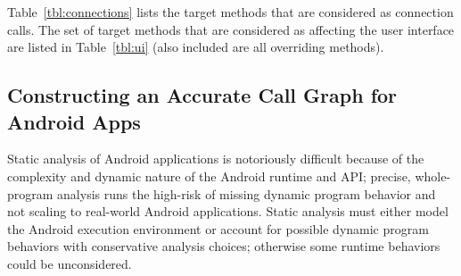 Table~\ref{tbl:connections} lists the target methods that are considered as
connection calls.  The set of target methods that are considered as
affecting the user interface are listed in Table~\ref{tbl:ui} (also
included are all overriding methods).







\subsection{Constructing an Accurate Call Graph for Android Apps }

Static analysis of Android applications is notoriously difficult
because of the complexity and dynamic nature of the Android runtime
and API; precise, whole-program analysis runs the high-risk of missing
dynamic program behavior and not scaling to real-world Android
applications.  Static analysis must either model the Android execution
environment or account for possible dynamic program behaviors with
conservative analysis choices; otherwise some runtime behaviors could
be unconsidered.

